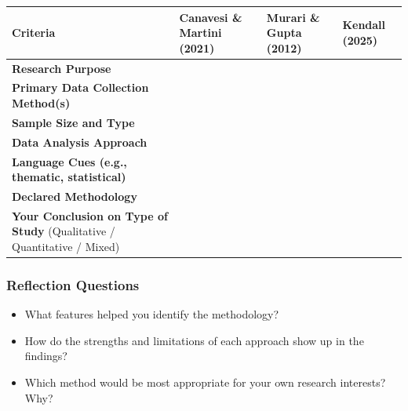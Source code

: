 \documentclass[
  letterpaper,
  DIV=11,
  numbers=noendperiod]{scrreprt}
\providecommand{\tightlist}{%
  \setlength{\itemsep}{0pt}\setlength{\parskip}{0pt}}\usepackage{longtable,booktabs,array}
\begin{document}
\begin{longtable}[]{@{}
  >{\raggedright\arraybackslash}p{}
  >{\raggedright\arraybackslash}p{}
  >{\raggedright\arraybackslash}p{}
  >{\raggedright\arraybackslash}p{}@{}}
\toprule\noalign{}
\begin{minipage}[b]{\linewidth}\raggedright
\textbf{Criteria}
\end{minipage} & \begin{minipage}[b]{\linewidth}\raggedright
\textbf{Canavesi \& Martini (2021)}
\end{minipage} & \begin{minipage}[b]{\linewidth}\raggedright
\textbf{Murari \& Gupta (2012)}
\end{minipage} & \begin{minipage}[b]{\linewidth}\raggedright
\textbf{Kendall (2025)}
\end{minipage} \\
\midrule\noalign{}
\endhead
\bottomrule\noalign{}
\endlastfoot
\textbf{Research Purpose} & & & \\
\textbf{Primary Data Collection Method(s)} & & & \\
\textbf{Sample Size and Type} & & & \\
\textbf{Data Analysis Approach} & & & \\
\textbf{Language Cues (e.g., thematic, statistical)} & & & \\
\textbf{Declared Methodology} & & & \\
\textbf{Your Conclusion on Type of Study} (Qualitative / Quantitative /
Mixed) & & & \\
\end{longtable}

\subsubsection*{Reflection Questions}\label{reflection-questions}

\begin{itemize}
\tightlist
\item
  What features helped you identify the methodology?
\item
  How do the strengths and limitations of each approach show up in the
  findings?
\item
  Which method would be most appropriate for your own research
  interests? Why?
\end{itemize}
\end{document}
